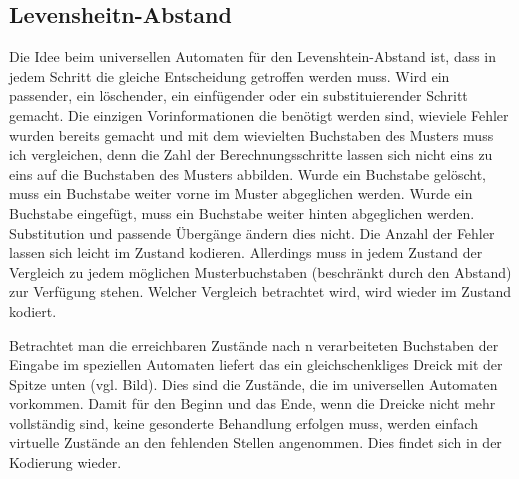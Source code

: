 \subsection{Levensheitn-Abstand}
Die Idee beim universellen Automaten für den Levenshtein-Abstand ist, dass in jedem Schritt die gleiche Entscheidung getroffen werden muss. Wird ein passender, ein löschender, ein einfügender oder ein substituierender Schritt gemacht. Die einzigen Vorinformationen die benötigt werden sind, wieviele Fehler wurden bereits gemacht und mit dem wievielten Buchstaben des Musters muss ich vergleichen, denn die Zahl der Berechnungsschritte lassen sich nicht eins zu eins auf die Buchstaben des Musters abbilden. Wurde ein Buchstabe gelöscht, muss ein Buchstabe weiter vorne im Muster abgeglichen werden. Wurde ein Buchstabe eingefügt, muss ein Buchstabe weiter hinten abgeglichen werden. Substitution und passende Übergänge ändern dies nicht. Die Anzahl der Fehler lassen sich leicht im Zustand kodieren. Allerdings muss in jedem Zustand der Vergleich zu jedem möglichen Musterbuchstaben (beschränkt durch den Abstand) zur Verfügung stehen. Welcher Vergleich betrachtet wird, wird wieder im Zustand kodiert.

Betrachtet man die erreichbaren Zustände nach n verarbeiteten Buchstaben der Eingabe im speziellen Automaten liefert das ein gleichschenkliges Dreick mit der Spitze unten (vgl. Bild). Dies sind die Zustände, die im universellen Automaten vorkommen. Damit für den Beginn und das Ende, wenn die Dreicke nicht mehr vollständig sind, keine gesonderte Behandlung erfolgen muss, werden einfach virtuelle Zustände an den fehlenden Stellen angenommen. Dies findet sich in der Kodierung wieder.

